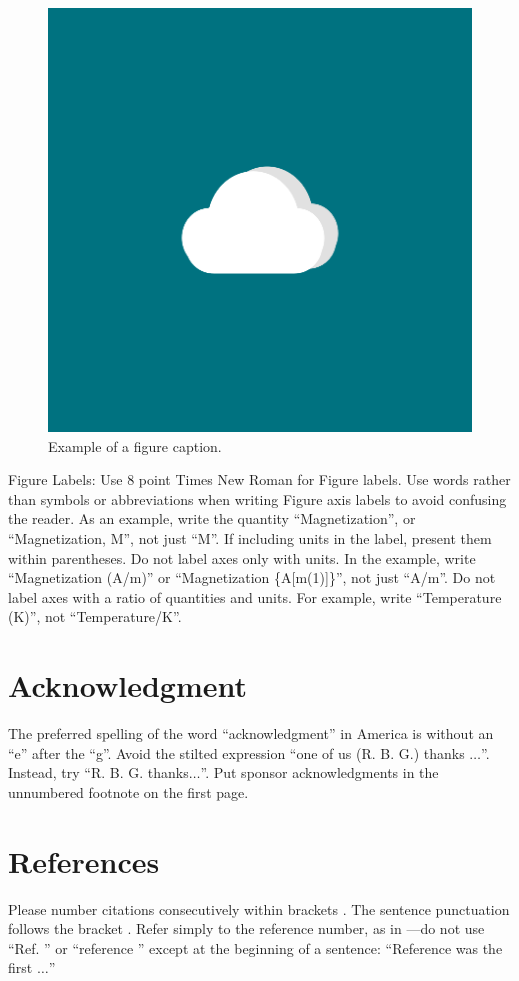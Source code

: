 \documentclass[10pt,conference]{IEEEtran}
\begin{document}
\begin{figure}[htbp]
\centerline{\includegraphics[width=0.5\columnwidth]{LogoBayuGede.png}}
\caption{Example of a figure caption.}
\label{fig}
\end{figure}

Figure Labels: Use 8 point Times New Roman for Figure labels. Use words 
rather than symbols or abbreviations when writing Figure axis labels to 
avoid confusing the reader. As an example, write the quantity 
``Magnetization'', or ``Magnetization, M'', not just ``M''. If including 
units in the label, present them within parentheses. Do not label axes only 
with units. In the example, write ``Magnetization (A/m)'' or ``Magnetization 
\{A[m(1)]\}'', not just ``A/m''. Do not label axes with a ratio of 
quantities and units. For example, write ``Temperature (K)'', not 
``Temperature/K''.

\section*{Acknowledgment}

The preferred spelling of the word ``acknowledgment'' in America is without 
an ``e'' after the ``g''. Avoid the stilted expression ``one of us (R. B. 
G.) thanks $\ldots$''. Instead, try ``R. B. G. thanks$\ldots$''. Put sponsor 
acknowledgments in the unnumbered footnote on the first page.

\section*{References}

Please number citations consecutively within brackets \cite{b1}. The 
sentence punctuation follows the bracket \cite{b2}. Refer simply to the reference 
number, as in \cite{b3}---do not use ``Ref. \cite{b3}'' or ``reference \cite{b3}'' except at 
the beginning of a sentence: ``Reference \cite{b3} was the first $\ldots$''
\end{document}
